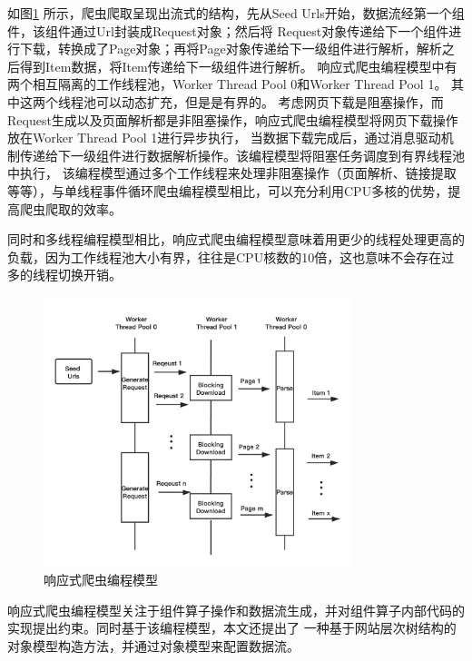 \documentclass[master]{njuthesis}
\begin{document}
如图\ref{fig:crawler} 所示，爬虫爬取呈现出流式的结构，先从Seed Urls开始，数据流经第一个组件，该组件通过Url封装成Request对象；然后将
Request对象传递给下一个组件进行下载，转换成了Page对象；再将Page对象传递给下一级组件进行解析，解析之后得到Item数据，将Item传递给下一级组件进行解析。
响应式爬虫编程模型中有两个相互隔离的工作线程池，Worker Thread Pool 0和Worker Thread Pool 1。
其中这两个线程池可以动态扩充，但是是有界的。
考虑网页下载是阻塞操作，而Request生成以及页面解析都是非阻塞操作，响应式爬虫编程模型将网页下载操作放在Worker Thread Pool 1进行异步执行，
当数据下载完成后，通过消息驱动机制传递给下一级组件进行数据解析操作。该编程模型将阻塞任务调度到有界线程池中执行，
该编程模型通过多个工作线程来处理非阻塞操作（页面解析、链接提取等等），与单线程事件循环爬虫编程模型相比，可以充分利用CPU多核的优势，提高爬虫爬取的效率。

同时和多线程编程模型相比，响应式爬虫编程模型意味着用更少的线程处理更高的负载，因为工作线程池大小有界，往往是CPU核数的10倍，这也意味不会存在过多的线程切换开销。



\begin{figure}[htbp]
\centering
\includegraphics[width= 0.8\textwidth]{pic/reactive-crawler.png}
\caption{响应式爬虫编程模型}\label{fig:crawler}
\end{figure}




响应式爬虫编程模型关注于组件算子操作和数据流生成，并对组件算子内部代码的实现提出约束。同时基于该编程模型，本文还提出了
一种基于网站层次树结构的对象模型构造方法，并通过对象模型来配置数据流。
\end{document}
